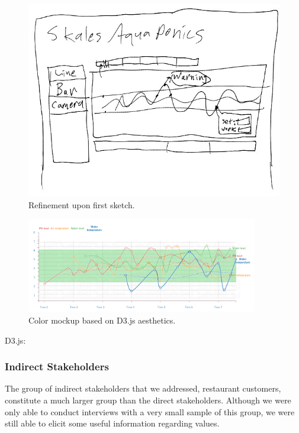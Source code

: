 \documentclass{sigchi}
\begin{document}
\begin{figure}[!h]
\centering
\includegraphics[width=0.9\columnwidth]{Sketch2}
\caption{Refinement upon first sketch.}
\label{fig:sketch2}
\end{figure}

\begin{figure}
\centering
\includegraphics[width=0.9\textwidth]{Mockup}
\caption{Color mockup based on D3.js aesthetics.}
\label{fig:mockup}
\end{figure}

D3.js: \cite{d3js}
 
 
\subsubsection{Indirect Stakeholders}

The group of indirect stakeholders that we addressed, restaurant customers, constitute a much larger group than the direct stakeholders. Although we were only able to conduct interviews with a very small sample of this group, we were still able to elicit some useful information regarding values. 
\end{document}
